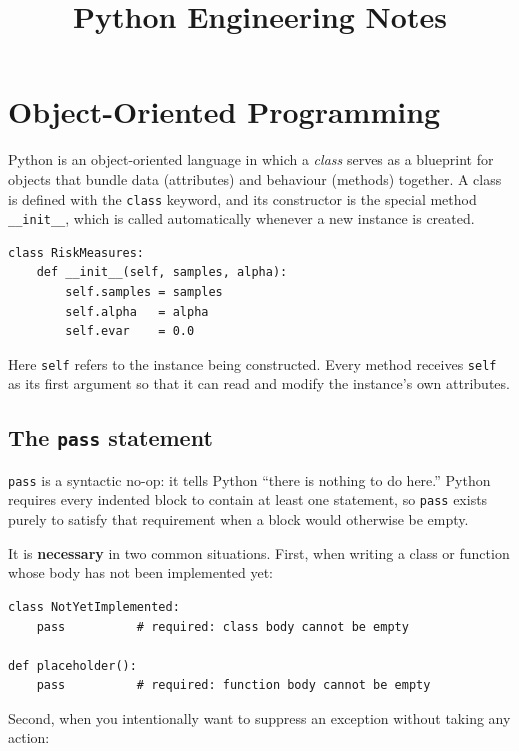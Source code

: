 \documentclass[11pt]{article}
\title{Python Engineering Notes}
\author{}
\date{}
\begin{document}
\maketitle
\tableofcontents
\newpage

\section{Object-Oriented Programming}

Python is an object-oriented language in which a \textit{class} serves as a blueprint
for objects that bundle data (attributes) and behaviour (methods) together.
A class is defined with the \texttt{class} keyword, and its constructor is the
special method \texttt{\_\_init\_\_}, which is called automatically whenever a new
instance is created.

\begin{lstlisting}[style=python]
class RiskMeasures:
    def __init__(self, samples, alpha):
        self.samples = samples
        self.alpha   = alpha
        self.evar    = 0.0
\end{lstlisting}

Here \texttt{self} refers to the instance being constructed. Every method receives
\texttt{self} as its first argument so that it can read and modify the instance's
own attributes.

\subsection{The \texttt{pass} statement}

\texttt{pass} is a syntactic no-op: it tells Python ``there is nothing to do here.''
Python requires every indented block to contain at least one statement, so
\texttt{pass} exists purely to satisfy that requirement when a block would otherwise
be empty.

It is \textbf{necessary} in two common situations. First, when writing a class or
function whose body has not been implemented yet:

\begin{lstlisting}[style=python]
class NotYetImplemented:
    pass          # required: class body cannot be empty

def placeholder():
    pass          # required: function body cannot be empty
\end{lstlisting}

Second, when you intentionally want to suppress an exception without taking any
action:
\end{document}
